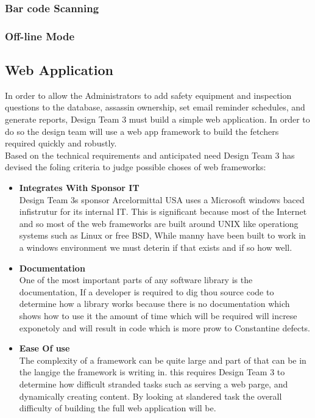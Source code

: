 \documentclass[Letter,11pt]{article}
\begin{document}
	\subsubsection{Bar code Scanning}
	
	\subsubsection{Off-line Mode}
	
	\subsection{Web Application}
		In order to allow the Administrators to add safety equipment and inspection questions to the database, assassin ownership, set email reminder schedules, and generate reports, Design Team 3 must build a simple web application. In order to do so the design team will use a web app framework to build the fetchers required quickly and robustly.
		\\
		Based on the technical requirements and anticipated need Design Team 3 has devised the foling criteria to judge possible choses of web frameworks: 
		\\
		\begin{minipage}[t]{0.5\textwidth}
		\begin{itemize}
			\item \textbf{Integrates With Sponsor IT}\\
			Design Team 3s sponsor Arcelormittal USA uses a Microsoft windows baced infistrutur for its internal IT. This is significant because  most of the Internet and so most of the web frameworks are built around UNIX like operationg systems such as Linux or free BSD, While manny have been built to work in a windows environment we must deterin if that exists and if so how well.
			
			\item \textbf{Documentation}\\
			One of the most important parts of any software library is the documentation, If a developer is required to dig thou source code to determine how a library works because there is no documentation which shows how to use it the amount of time which will be required will increse exponetoly and will result in code which is more prow to Constantine defects.
				
			\item \textbf{Ease Of use} \\
			The complexity of a framework can be quite large and part of that can be in the langige the framework is writing in. this requires Design Team 3 to determine how difficult stranded tasks such as serving a web parge, and dynamically creating content. By looking at slandered task the overall difficulty of building the full web application will be.	
		\end{itemize}
		\end{minipage}
\end{document}
